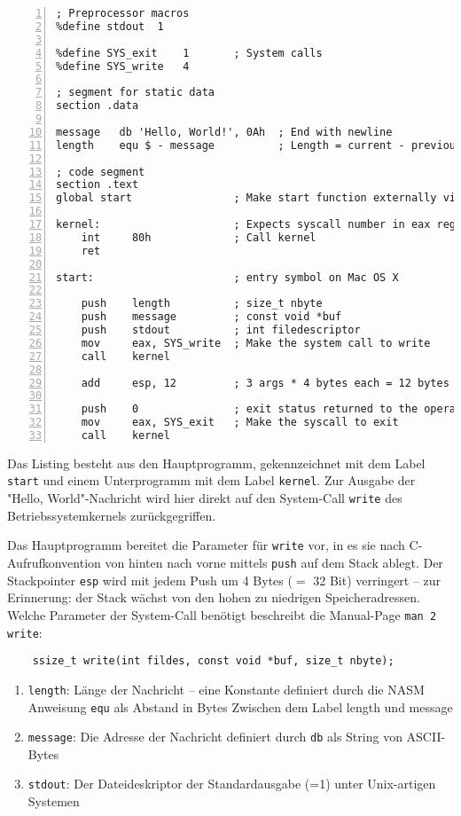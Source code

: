 \begin{lstlisting}[numbers=left,caption=hello.asm]
; Preprocessor macros
%define stdout  1

%define SYS_exit    1       ; System calls
%define SYS_write   4

; segment for static data
section .data

message   db 'Hello, World!', 0Ah  ; End with newline
length    equ $ - message          ; Length = current - previous address

; code segment
section .text
global start                ; Make start function externally visible for linker

kernel:                     ; Expects syscall number in eax register
    int     80h             ; Call kernel
    ret

start:                      ; entry symbol on Mac OS X

    push    length          ; size_t nbyte
    push    message         ; const void *buf
    push    stdout          ; int filedescriptor
    mov     eax, SYS_write  ; Make the system call to write
    call    kernel
   
    add     esp, 12         ; 3 args * 4 bytes each = 12 bytes

    push    0               ; exit status returned to the operating system
    mov     eax, SYS_exit   ; Make the syscall to exit
    call    kernel
\end{lstlisting}

Das Listing besteht aus den Hauptprogramm, gekennzeichnet mit dem Label \texttt{start} und einem Unterprogramm mit dem Label \texttt{kernel}. Zur Ausgabe der "Hello, World"-Nachricht wird hier direkt auf den System-Call \texttt{write} des Betriebssystemkernels zurückgegriffen. 

Das Hauptprogramm bereitet die Parameter für \texttt{write} vor, in es sie nach C-Aufrufkonvention von hinten nach vorne mittels \texttt{push} auf dem Stack ablegt. Der Stackpointer \texttt{esp} wird mit jedem Push um 4 Bytes ($=$ 32 Bit) verringert – zur Erinnerung: der Stack wächst von den hohen zu niedrigen Speicheradressen. Welche Parameter der System-Call benötigt beschreibt die Manual-Page \texttt{man 2 write}:

\begin{lstlisting}
	ssize_t write(int fildes, const void *buf, size_t nbyte);
\end{lstlisting}

\begin{enumerate}
\item {\tt length}:	Länge der Nachricht – eine Konstante definiert durch die
NASM Anweisung {\tt equ} als Abstand in Bytes Zwischen dem Label length und message
\item {\tt message}: Die Adresse der Nachricht definiert durch {\tt db} als String von ASCII-Bytes
\item {\tt stdout}: Der Dateideskriptor der Standardausgabe (=1) unter Unix-artigen Systemen
\end{enumerate}

